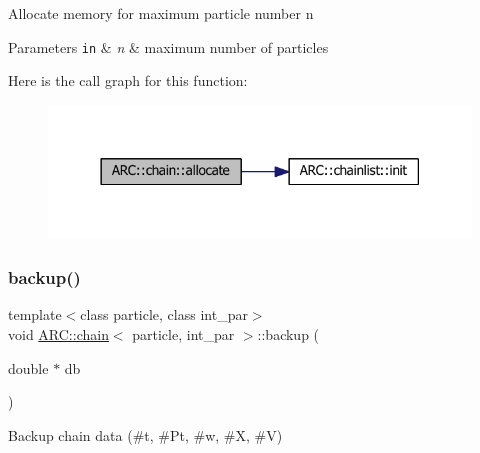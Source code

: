 Allocate memory for maximum particle number n 
\begin{DoxyParams}[1]{Parameters}
\mbox{\tt in}  & {\em n} & maximum number of particles \\
\hline
\end{DoxyParams}
Here is the call graph for this function\+:
\nopagebreak
\begin{figure}[H]
\begin{center}
\leavevmode
\includegraphics[width=318pt]{classARC_1_1chain_a0c3c1daffa75873b39d9964eebc6566f_cgraph}
\end{center}
\end{figure}
\hypertarget{classARC_1_1chain_ad098493cd057ac19786f5bc85f9ab25d}{}\label{classARC_1_1chain_ad098493cd057ac19786f5bc85f9ab25d} 
\subsubsection{\texorpdfstring{backup()}{backup()}}
{\footnotesize\ttfamily template$<$class particle, class int\+\_\+par$>$ \\
void \hyperlink{classARC_1_1chain}{A\+R\+C\+::chain}$<$ particle, int\+\_\+par $>$\+::backup (\begin{DoxyParamCaption}\item[{double $\ast$}]{db }\end{DoxyParamCaption})\hspace{0.3cm}{\ttfamily [inline]}}



Backup chain data (\#t, \#\+Pt, \#w, \#X, \#V) 

